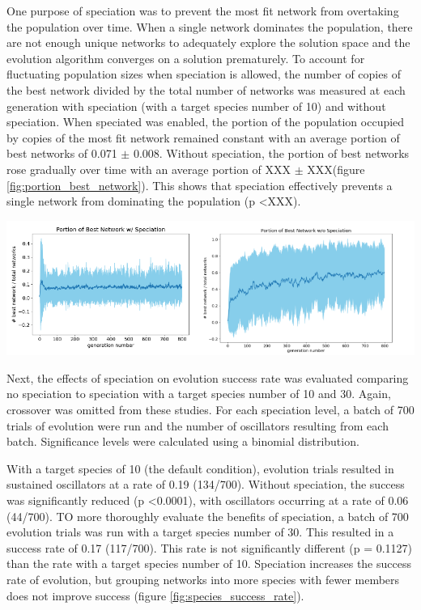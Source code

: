 \documentclass[12pt]{report}
\begin{document}
One purpose of speciation was to prevent the most fit network from overtaking the population over time. When a single network dominates the population, there are not enough unique networks to adequately explore the solution space and the evolution algorithm converges on a solution prematurely. To account for fluctuating population sizes when speciation is allowed, the number of copies of the best network divided by the total number of networks was measured at each generation with speciation (with a target species number of 10) and without speciation.  When speciated was enabled, the portion of the population occupied by copies of the most fit network
remained constant with an average portion of best networks of 0.071 $\pm$ 0.008. Without speciation, the portion of best networks rose gradually over time with an average portion of XXX $\pm$ XXX(figure \ref{fig:portion_best_network}). This shows that speciation effectively prevents a single network from dominating the population (p \textless XXX).

\begin{center}
    \includegraphics[width=18cm]{images/portion_best_network.png}
    \label{fig:portion_best_network}
\end{center}


Next, the effects of speciation on evolution success rate was evaluated comparing no speciation to speciation with a target species number of 10 and 30. Again, crossover was omitted from these studies. For each speciation level, a batch of 700 trials of evolution were run and the number of oscillators resulting from each batch. Significance levels were calculated using a binomial distribution. 

With a target species of 10 (the default condition), evolution trials resulted in sustained oscillators at a rate of 0.19 (134/700). Without speciation, the success was significantly reduced (p \textless 0.0001), with oscillators occurring at a rate of 0.06 (44/700). TO more thoroughly evaluate the benefits of speciation, a batch of 700 evolution trials was run with a target species number of 30. This resulted in a success rate of 0.17 (117/700). This rate is not significantly different (p = 0.1127) than the rate with a target species number of 10. Speciation increases the success rate of evolution, but grouping networks into more species with fewer members does not improve success (figure \ref{fig:species_success_rate}). 
\end{document}

